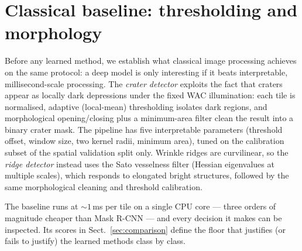 \section{Classical baseline: thresholding and morphology}
\label{sec:classical}

Before any learned method, we establish what classical image processing achieves on the same protocol: a deep model is only interesting if it beats interpretable, millisecond-scale processing. The \emph{crater detector} exploits the fact that craters appear as locally dark depressions under the fixed WAC illumination: each tile is normalised, adaptive (local-mean) thresholding isolates dark regions, and morphological opening/closing plus a minimum-area filter clean the result into a binary crater mask. The pipeline has five interpretable parameters (threshold offset, window size, two kernel radii, minimum area), tuned on the calibration subset of the spatial validation split only. Wrinkle ridges are curvilinear, so the \emph{ridge detector} instead uses the Sato vesselness filter (Hessian eigenvalues at multiple scales), which responds to elongated bright structures, followed by the same morphological cleaning and threshold calibration.

The baseline runs at ${\sim}1$\,ms per tile on a single CPU core --- three orders of magnitude cheaper than Mask R-CNN --- and every decision it makes can be inspected. Its scores in Sect.~\ref{sec:comparison} define the floor that justifies (or fails to justify) the learned methods class by class.
